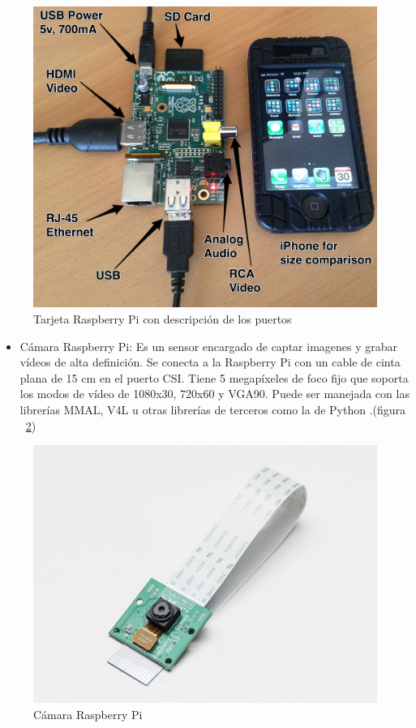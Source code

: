 \begin{figure}[hbtp]
\centering
\includegraphics[scale=0.1]{imagenes/raspberry_pi_iphone.jpg}
\caption{Tarjeta Raspberry Pi con descripción de los puertos}
\label{fig:Raspe}
\end{figure}

\begin{itemize}
\item C\'amara Raspberry Pi: Es un sensor encargado de captar imagenes y grabar vídeos de alta definición. Se conecta a la Raspberry Pi con un cable de cinta plana de 15 cm en el puerto CSI. Tiene 5 megapíxeles de foco fijo que soporta los modos de vídeo de 1080x30, 720x60 y VGA90. Puede ser manejada con las librerías MMAL, V4L u otras librerías de terceros como la de Python \cite{raspberrycam}.(figura ~\ref{fig:came})  %

\end{itemize}

\begin{figure}[hbtp]
\centering
\includegraphics[scale=0.35]{imagenes/1367-01.jpg}
\caption{C\'amara Raspberry Pi}
\label{fig:came}
\end{figure}


